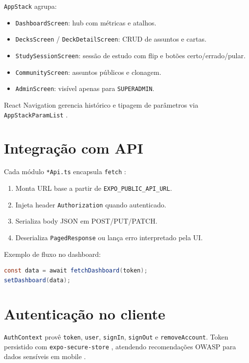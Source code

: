 \texttt{AppStack} agrupa:
\begin{itemize}
    \item \texttt{DashboardScreen}: hub com métricas e atalhos.
    \item \texttt{DecksScreen} / \texttt{DeckDetailScreen}: CRUD de assuntos e cartas.
    \item \texttt{StudySessionScreen}: sessão de estudo com flip e botões certo/errado/pular.
    \item \texttt{CommunityScreen}: assuntos públicos e clonagem.
    \item \texttt{AdminScreen}: visível apenas para \texttt{SUPERADMIN}.
\end{itemize}

React Navigation gerencia histórico e tipagem de parâmetros via \texttt{AppStackParamList} \cite{react_navigation}.

\section{Integração com API}

Cada módulo \texttt{*Api.ts} encapsula \texttt{fetch} \cite{mdn_fetch}:

\begin{enumerate}
    \item Monta URL base a partir de \texttt{EXPO\_PUBLIC\_API\_URL}.
    \item Injeta header \texttt{Authorization} quando autenticado.
    \item Serializa body JSON em POST/PUT/PATCH.
    \item Deserializa \texttt{PagedResponse} ou lança erro interpretado pela UI.
\end{enumerate}

Exemplo de fluxo no dashboard:

\begin{lstlisting}[language=Java,caption={Chamada tipada ao dashboard (TypeScript)},label={lst:dashboard-fetch}]
const data = await fetchDashboard(token);
setDashboard(data);
\end{lstlisting}

\section{Autenticação no cliente}

\texttt{AuthContext} provê \texttt{token}, \texttt{user}, \texttt{signIn}, \texttt{signOut} e \texttt{removeAccount}. Token persistido com \texttt{expo-secure-store} \cite{expo_secure_store}, atendendo recomendações OWASP para dados sensíveis em mobile \cite{owasp_mobile}.

